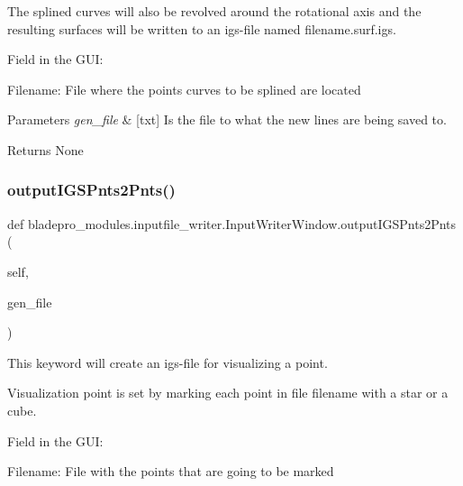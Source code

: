 The splined curves will also be revolved around the rotational axis and the resulting surfaces will be written to an igs-\/file named filename.\+surf.\+igs.

Field in the G\+UI\+: \begin{DoxyItemize}
\item {\ttfamily Filename\+:} File where the points curves to be splined are located\end{DoxyItemize}

\begin{DoxyParams}{Parameters}
{\em gen\+\_\+file} & \mbox{[}txt\mbox{]} Is the file to what the new lines are being saved to. \\
\hline
\end{DoxyParams}
\begin{DoxyReturn}{Returns}
None 
\end{DoxyReturn}
\hypertarget{a00070_a07862d0aa6332b54008342a24c2e30a3}{}\label{a00070_a07862d0aa6332b54008342a24c2e30a3} 
\subsubsection{\texorpdfstring{output\+I\+G\+S\+Pnts2\+Pnts()}{outputIGSPnts2Pnts()}}
{\footnotesize\ttfamily def bladepro\+\_\+modules.\+inputfile\+\_\+writer.\+Input\+Writer\+Window.\+output\+I\+G\+S\+Pnts2\+Pnts (\begin{DoxyParamCaption}\item[{}]{self,  }\item[{}]{gen\+\_\+file }\end{DoxyParamCaption})}



This keyword will create an igs-\/file for visualizing a point. 

Visualization point is set by marking each point in file filename with a star or a cube.

Field in the G\+UI\+: \begin{DoxyItemize}
\item {\ttfamily Filename\+:} File with the points that are going to be marked\end{DoxyItemize}

